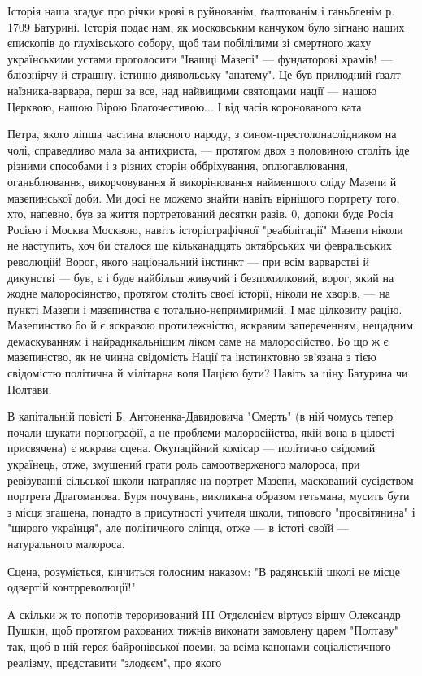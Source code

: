 Історія наша згадує про річки крові в руйнованім, ґвалтованім і ганьбленім р. 1709 Батурині. Історія подає нам, як московським канчуком було зігнано наших єпископів до глухівського собору, щоб там побілілими зі смертного жаху українськими устами проголосити "Івашці Мазепі" — фундаторові храмів! — блюзнірчу й страшну, істинно диявольську "анатему". Це був прилюдний ґвалт наїзника-варвара, перш за все, над найвищими святощами нації — нашою Церквою, нашою Вірою Благочестивою... І від часів коронованого ката

Петра, якого ліпша частина власного народу, з сином-престолонаслідником на чолі, справедливо мала за антихриста, — протягом двох з половиною століть іде різними способами і з різних сторін оббріхування, оплюгавлювання, оганьблювання, викорчовування й викорінювання найменшого сліду Мазепи й мазепинської доби. Ми досі не можемо знайти навіть вірнішого портрету того, хто, напевно, був за життя портретований десятки разів. 0, допоки буде Росія Росією і Москва Москвою, навіть історіографічної "реабілітації" Мазепи ніколи не наступить, хоч би сталося ще кільканадцять октябрських чи февральських революцій! Ворог, якого національний інстинкт — при всім варварстві й дикунстві — був, є і буде найбільш живучий і безпомилковий, ворог, який на жодне малоросіянство, протягом століть своєї історії, ніколи не хворів, — на пункті Мазепи і мазепинства є тотально-непримиримий. І має цілковиту рацію. Мазепинство бо й є яскравою протилежністю, яскравим запереченням, нещадним демаскуванням і найрадикальнішим ліком саме на малоросійство. Бо що ж є мазепинство, як не чинна свідомість Нації та інстинктовно зв'язана з тією свідомістю політична й мілітарна воля Нацією бути? Навіть за ціну Батурина чи Полтави.

В капітальній повісті Б. Антоненка-Давидовича "Смерть" (в ній чомусь тепер почали шукати порнографії, а не проблеми малоросійства, якій вона в цілості присвячена) є яскрава сцена. Окупаційний комісар — політично свідомий українець, отже, змушений грати роль самоотверженого малороса, при ревізуванні сільської школи натрапляє на портрет Мазепи, маскований сусідством портрета Драгоманова. Буря почувань, викликана образом гетьмана, мусить бути з місця згашена, понадто в присутності учителя школи, типового "просвітянина" і "щирого українця", але політичного сліпця, отже — в істоті своїй — натурального малороса.

Сцена, розуміється, кінчиться голосним наказом: "В радянській школі не місце одвертій контрреволюції!"

А скільки ж то попотів тероризований III Отдєлєнієм віртуоз віршу Олександр Пушкін, щоб протягом рахованих тижнів виконати замовлену царем "Полтаву" так, щоб в ній героя байронівської поеми, за всіма канонами соціалістичного реалізму, представити "злодєєм", про якого

